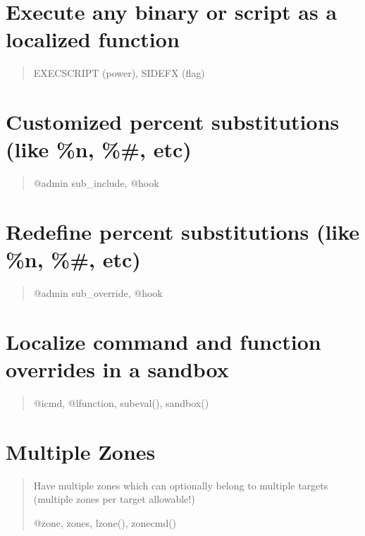 \documentclass[letterpaper,10pt,english]{sphinxmanual}
\begin{document}
\section{Execute any binary or script as a localized function}
\label{\detokenize{features:execute-any-binary-or-script-as-a-localized-function}}\begin{quote}

\sphinxAtStartPar
EXECSCRIPT (power), SIDEFX (flag)
\end{quote}


\section{Customized percent substitutions (like \%n, \%\#, etc)}
\label{\detokenize{features:customized-percent-substitutions-like-n-etc}}\begin{quote}

\sphinxAtStartPar
@admin sub\_include, @hook
\end{quote}


\section{Redefine percent substitutions (like \%n, \%\#, etc)}
\label{\detokenize{features:redefine-percent-substitutions-like-n-etc}}\begin{quote}

\sphinxAtStartPar
@admin sub\_override, @hook
\end{quote}


\section{Localize command and function overrides in a sandbox}
\label{\detokenize{features:localize-command-and-function-overrides-in-a-sandbox}}\begin{quote}

\sphinxAtStartPar
@icmd, @lfunction, subeval(), sandbox()
\end{quote}


\section{Multiple Zones}
\label{\detokenize{features:multiple-zones}}\begin{quote}

\sphinxAtStartPar
Have multiple zones which can optionally belong to multiple targets (multiple zones per target allowable!)

\sphinxAtStartPar
@zone, zones, lzone(), zonecmd()
\end{quote}
\end{document}

